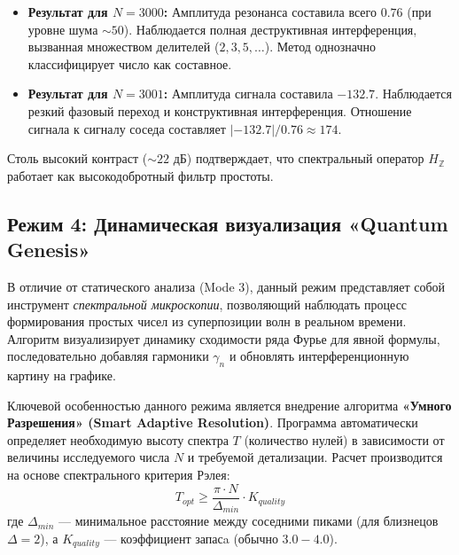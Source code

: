 \documentclass{article}
\numberwithin{equation}{section}
\theoremstyle{plain}
\theoremstyle{definition}
\theoremstyle{remark}
\def\cdot{·}\def\times{×}\def\pm{±}\def\mp{∓}\def\approx{≈}%
\begin{document}
\begin{itemize}
    \item \textbf{Результат для $N=3000$:} Амплитуда резонанса составила всего $0.76$ (при уровне шума $\sim 50$). Наблюдается полная деструктивная интерференция, вызванная множеством делителей ($2, 3, 5, \dots$). Метод однозначно классифицирует число как составное.
    \item \textbf{Результат для $N=3001$:} Амплитуда сигнала составила $-132.7$. Наблюдается резкий фазовый переход и конструктивная интерференция. Отношение сигнала к сигналу соседа составляет $|-132.7| / 0.76 \approx 174$.
\end{itemize}

Столь высокий контраст ($\sim 22$ дБ) подтверждает, что спектральный оператор $H_{\mathbb{Z}}$ работает как высокодобротный фильтр простоты.


\subsection*{Режим 4: Динамическая визуализация «Quantum Genesis»}

В отличие от статического анализа (Mode 3), данный режим представляет собой инструмент \textit{спектральной микроскопии}, позволяющий наблюдать процесс формирования простых чисел из суперпозиции волн в реальном времени. Алгоритм визуализирует динамику сходимости ряда Фурье для явной формулы, последовательно добавляя гармоники $\gamma_n$ и обновлять интерференционную картину на графике.

Ключевой особенностью данного режима является внедрение алгоритма \textbf{«Умного Разрешения» (Smart Adaptive Resolution)}. Программа автоматически определяет необходимую высоту спектра $T$ (количество нулей) в зависимости от величины исследуемого числа $N$ и требуемой детализации. Расчет производится на основе спектрального критерия Рэлея:
\begin{equation}
T_{opt} \ge \frac{\pi \cdot N}{\Delta_{min}} \cdot K_{quality}
\end{equation}
где $\Delta_{min}$ — минимальное расстояние между соседними пиками (для близнецов $\Delta=2$), а $K_{quality}$ — коэффициент запасa (обычно $3.0 - 4.0$).
\end{document}
